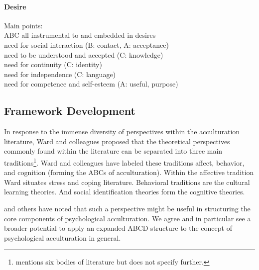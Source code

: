 \documentclass[nobib]{tufte-handout}
\begin{document}
\paragraph{Desire} Main points:\\
ABC all instrumental to and embedded in desires\\ 
need for social interaction (B: contact, A: acceptance)\\
need to be understood and accepted (C: knowledge)\\
need for continuity (C: identity)\\
need for independence (C: language)\\
need for competence and self-esteem (A: useful, purpose)

\subsection{Framework Development}
In response to the immense diversity of perspectives within the acculturation literature, Ward and colleagues \citep{Ward2001, Masgoret2006, Ward2019} proposed that the theoretical perspectives commonly found within the literature can be separated into three main traditions\footnote{\citet{Ward2001} mentions six bodies of literature but does not specify further.}. Ward and colleagues have labeled these traditions affect, behavior, and cognition (forming the ABCs of acculturation). Within the affective tradition Ward situates stress and coping literature. Behavioral traditions are the cultural learning theories. And social identification theories form the cognitive theories.

\citet{Sam2006b} and others have noted that such a perspective might be useful in structuring the core components of psychological acculturation. We agree and in particular see a broader potential to apply an expanded ABCD structure to the concept of psychological acculturation in general. 
\end{document}
